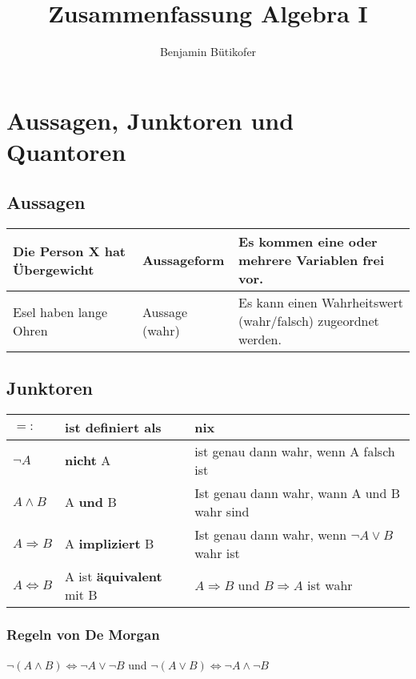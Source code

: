 \documentclass[a4paper,DIV10,12pt,headsepline,smallheadings,halfparskip-]{scrreprt}
\title{Zusammenfassung Algebra I}
\author{Benjamin Bütikofer}
\begin{document}
	\maketitle
	\tableofcontents

	\chapter{Aussagen, Junktoren und Quantoren}
	\section{Aussagen}
	\begin{longtable}{|p{}|p{}|p{}|}
		\hline
		Die Person X hat Übergewicht & Aussageform & Es kommen eine oder mehrere Variablen frei vor. \\
		\hline
		Esel haben lange Ohren & Aussage (wahr) & Es kann einen Wahrheitswert (wahr/falsch) zugeordnet werden. \\
		\hline
	\end{longtable}

	\section{Junktoren}
	\begin{longtable}{|l|l|l|}
		\hline
		\(=:\) & ist definiert als & nix \\
		\hline
		\(\neg A\) & \textbf{nicht} A & ist genau dann wahr, wenn A falsch ist \\
		\hline
		\( A \wedge B \) & A \textbf{und} B & Ist genau dann wahr, wann A und B wahr sind \\
		\hline
		\( A \Rightarrow B \) & A \textbf{impliziert} B & Ist genau dann wahr, wenn \(\neg A \vee B \) wahr ist \\
		\hline
		\( A \Leftrightarrow B \) & A ist \textbf{äquivalent} mit B & \(A \Rightarrow B \) und \(B \Rightarrow A \) ist wahr \\
		\hline
	\end{longtable}

	\subsection{Regeln von De Morgan}
	\( \neg (A \wedge B) \Leftrightarrow \neg A \vee \neg B\) und \(\neg (A \vee B) \Leftrightarrow \neg A \wedge \neg B \)
\end{document}
